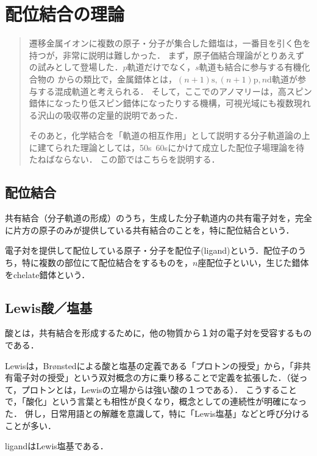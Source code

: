 \documentclass[uplatex, dvipdfmx]{jsreport}
\begin{document}
\section{配位結合の理論}

\begin{quotation}
    遷移金属イオンに複数の原子・分子が集合した錯塩は，一番目を引く色を持つが，非常に説明は難しかった．
    まず，原子価結合理論がとりあえずの試みとして登場した．$p$軌道だけでなく，$s$軌道も結合に参与する有機化合物の
    からの類比で，金属錯体とは，$(n+1)\mathrm{s},(n+1)\mathrm{p}, n\mathrm{d}$軌道が参与する混成軌道と考えられる．
    そして，ここでのアノマリーは，高スピン錯体になったり低スピン錯体になったりする機構，可視光域にも複数現れる沢山の吸収帯の定量的説明であった．

    そのあと，化学結合を「軌道の相互作用」として説明する分子軌道論の上に建てられた理論としては，50s~60sにかけて成立した配位子場理論を待たねばならない．
    この節ではこちらを説明する．
\end{quotation}

\subsection{配位結合}

\begin{definition}
    共有結合（分子軌道の形成）のうち，生成した分子軌道内の共有電子対を，完全に片方の原子のみが提供している共有結合のことを，特に配位結合という．

    電子対を提供して配位している原子・分子を配位子(ligand)という．配位子のうち，特に複数の部位にて配位結合をするものを，$n$座配位子といい，生じた錯体をchelate錯体という．
\end{definition}

\subsection{Lewis酸／塩基}

\begin{definition}[Lewis, 1923]
    酸とは，共有結合を形成するために，他の物質から１対の電子対を受容するものである．

    Lewisは，Brønstedによる酸と塩基の定義である「プロトンの授受」から，「非共有電子対の授受」という双対概念の方に乗り移ることで定義を拡張した．（従って，プロトンとは，Lewisの立場からは強い酸の１つである）．
    こうすることで，「酸化」という言葉とも相性が良くなり，概念としての連続性が明確になった．
    併し，日常用語との解離を意識して，特に「Lewis塩基」などと呼び分けることが多い．
\end{definition}
\begin{example}
    ligandはLewis塩基である．
\end{example}
\end{document}
